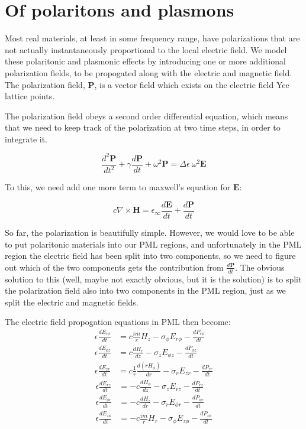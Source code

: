 \documentclass[floats]{book}
\begin{document}
\chapter{Of polaritons and plasmons}\label{polaritons}

Most real materials, at least in some frequency range, have polarizations
that are not actually instantaneously proportional to the local electric
field.  We model these polaritonic and plasmonic effects by introducing one
or more additional polarization fields, to be propogated along with the
electric and magnetic field.  The polarization field, $\mathbf{P}$, is a
vector field which exists on the electric field Yee lattice points.

The polarization field obeys a second order differential equation, which
means that we need to keep track of the polarization at two time steps, in
order to integrate it.

\begin{equation}
\frac{d^2\mathbf{P}}{dt^2} + \gamma \frac{d\mathbf{P}}{dt}
+ \omega^2 \mathbf{P} = \Delta\epsilon\ \omega^2 \mathbf{E}
\end{equation}

To this, we need add one more term to maxwell's equation for $\mathbf E$:

\begin{equation}
c \nabla \times \mathbf{H} = \epsilon_\infty \frac{d\mathbf{E}}{dt}
 + \frac{d\mathbf{P}}{dt}
\end{equation}

So far, the polarization is beautifully simple.  However, we would love to
be able to put polaritonic materials into our PML regions, and
unfortunately in the PML region the electric field has been split into two
components, so we need to figure out which of the two components gets the
contribution from $\frac{d\mathbf{P}}{dt}$.  The obvious solution to this
(well, maybe not exactly obvious, but it is the solution) is to split the
polarization field also into two components in the PML region, just as we
split the electric and magnetic fields.

The electric field propogation equations in PML then become:
\begin{align}
\epsilon\frac{dE_{r\phi}}{dt} &=   c \frac{im}r H_z
             - \sigma_\phi E_{r\phi} - \frac{dP_{r\phi}}{dt} \\
\epsilon\frac{dE_{\phi z}}{dt} &=   c \frac{dH_r}{dz}
             - \sigma_z E_{\phi z} - \frac{dP_{\phi z}}{dt} \\
\epsilon\frac{dE_{zr}}{dt} &=   c \frac1r\frac{d(rH_\phi)}{dr}
             - \sigma_r E_{zr} - \frac{dP_{zr}}{dt}
\end{align}
\begin{align}
\epsilon\frac{dE_{rz}}{dt} &= -c\frac{dH_\phi}{dz}
             - \sigma_z E_{rz} - \frac{dP_{rz}}{dt}\\
\epsilon\frac{dE_{\phi r}}{dt} &=-c \frac{dH_z}{dr}
             - \sigma_r E_{\phi r} - \frac{dP_{\phi r}}{dt} \\
\epsilon\frac{dE_{z\phi}}{dt} &=-c \frac{im}r H_r \label{polariton_pml}
             - \sigma_\phi E_{z\phi} - \frac{dP_{z\phi}}{dt}
\end{align}
\end{document}
